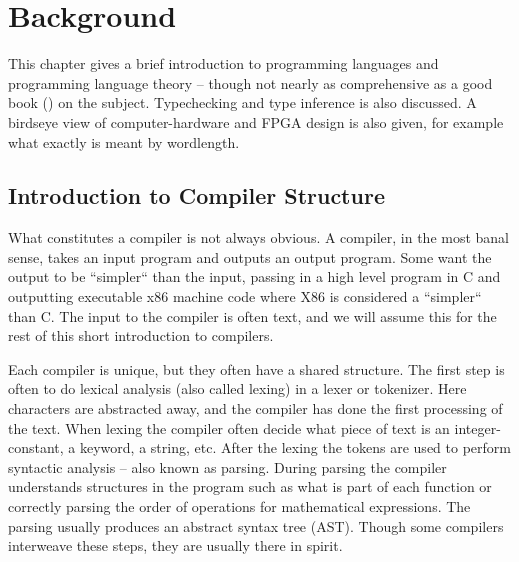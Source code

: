 \chapter{Background}
\label{chaBackground}
This chapter gives a brief introduction to programming languages and programming language theory -- though not nearly as comprehensive as a good book (\cite{src:DragonBook}\cite{src:CraftingInterp}) on the subject. Typechecking and type inference is also discussed. A birdseye view of computer-hardware and FPGA design is also given, for example what exactly is meant by wordlength.

% 

\section{Introduction to Compiler Structure}
What constitutes a compiler is not always obvious. A compiler, in the most banal sense, takes an input program and outputs an output program. Some want the output to be ``simpler`` than the input, passing in a high level program in C and outputting executable x86 machine code where X86 is considered a ``simpler`` than C. The input to the compiler is often text, and we will assume this for the rest of this short introduction to compilers.

Each compiler is unique, but they often have a shared structure. The first step is often to do lexical analysis (also called lexing) in a lexer or tokenizer. Here characters are abstracted away, and the compiler has done the first processing of the text. When lexing the compiler often decide what piece of text is an integer-constant, a keyword, a string, etc. After the lexing the tokens are used to perform syntactic analysis -- also known as parsing. During parsing the compiler understands structures in the program such as what is part of each function or correctly parsing the order of operations for mathematical expressions. The parsing usually produces an abstract syntax tree (AST). Though some compilers interweave these steps, they are usually there in spirit.

